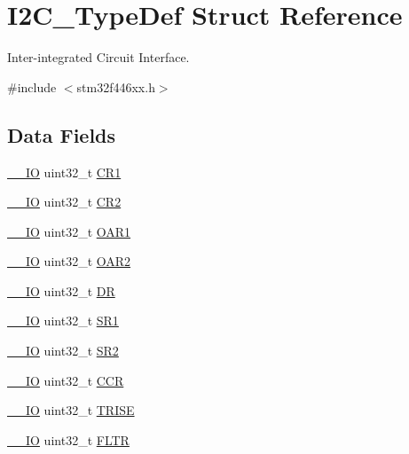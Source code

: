 \hypertarget{struct_i2_c___type_def}{}\section{I2\+C\+\_\+\+Type\+Def Struct Reference}
\label{struct_i2_c___type_def}


Inter-\/integrated Circuit Interface.  




{\ttfamily \#include $<$stm32f446xx.\+h$>$}

\subsection*{Data Fields}
\begin{DoxyCompactItemize}
\item 
\mbox{\hyperlink{core__sc300_8h_aec43007d9998a0a0e01faede4133d6be}{\+\_\+\+\_\+\+IO}} uint32\+\_\+t \mbox{\hyperlink{struct_i2_c___type_def_ab0ec7102960640751d44e92ddac994f0}{C\+R1}}
\item 
\mbox{\hyperlink{core__sc300_8h_aec43007d9998a0a0e01faede4133d6be}{\+\_\+\+\_\+\+IO}} uint32\+\_\+t \mbox{\hyperlink{struct_i2_c___type_def_afdfa307571967afb1d97943e982b6586}{C\+R2}}
\item 
\mbox{\hyperlink{core__sc300_8h_aec43007d9998a0a0e01faede4133d6be}{\+\_\+\+\_\+\+IO}} uint32\+\_\+t \mbox{\hyperlink{struct_i2_c___type_def_a08b4be0d626a00f26bc295b379b3bba6}{O\+A\+R1}}
\item 
\mbox{\hyperlink{core__sc300_8h_aec43007d9998a0a0e01faede4133d6be}{\+\_\+\+\_\+\+IO}} uint32\+\_\+t \mbox{\hyperlink{struct_i2_c___type_def_ab5c57ffed0351fa064038939a6c0bbf6}{O\+A\+R2}}
\item 
\mbox{\hyperlink{core__sc300_8h_aec43007d9998a0a0e01faede4133d6be}{\+\_\+\+\_\+\+IO}} uint32\+\_\+t \mbox{\hyperlink{struct_i2_c___type_def_a3df0d8dfcd1ec958659ffe21eb64fa94}{DR}}
\item 
\mbox{\hyperlink{core__sc300_8h_aec43007d9998a0a0e01faede4133d6be}{\+\_\+\+\_\+\+IO}} uint32\+\_\+t \mbox{\hyperlink{struct_i2_c___type_def_acefca4fd83c4b7846ae6d3cfe7bb8df9}{S\+R1}}
\item 
\mbox{\hyperlink{core__sc300_8h_aec43007d9998a0a0e01faede4133d6be}{\+\_\+\+\_\+\+IO}} uint32\+\_\+t \mbox{\hyperlink{struct_i2_c___type_def_a89623ee198737b29dc0a803310605a83}{S\+R2}}
\item 
\mbox{\hyperlink{core__sc300_8h_aec43007d9998a0a0e01faede4133d6be}{\+\_\+\+\_\+\+IO}} uint32\+\_\+t \mbox{\hyperlink{struct_i2_c___type_def_a5e1322e27c40bf91d172f9673f205c97}{C\+CR}}
\item 
\mbox{\hyperlink{core__sc300_8h_aec43007d9998a0a0e01faede4133d6be}{\+\_\+\+\_\+\+IO}} uint32\+\_\+t \mbox{\hyperlink{struct_i2_c___type_def_a5d5764c0ec44b661da957e6343f9e7b5}{T\+R\+I\+SE}}
\item 
\mbox{\hyperlink{core__sc300_8h_aec43007d9998a0a0e01faede4133d6be}{\+\_\+\+\_\+\+IO}} uint32\+\_\+t \mbox{\hyperlink{struct_i2_c___type_def_aa23ced8246d69edb9261a8de1f1e253f}{F\+L\+TR}}
\end{DoxyCompactItemize}


